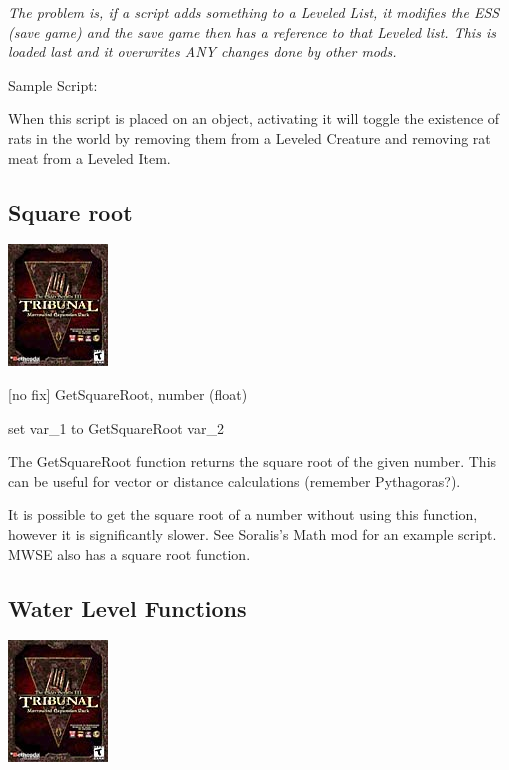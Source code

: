 \emph{\hfill\break
The problem is, if a script adds something to a Leveled List, it
modifies the ESS (save game) and the save game then has a reference to
that Leveled list. This is loaded last and it overwrites ANY changes
done by other mods.}

Sample Script:

When this script is placed on an object, activating it will toggle the
existence of rats in the world by removing them from a Leveled Creature
and removing rat meat from a Leveled Item.



\hypertarget{square-root}{%
\subsection{Square root}\label{square-root}}

\includegraphics{media/image6.png}

{[}no fix{]} GetSquareRoot, number (float)

set var\_1 to GetSquareRoot var\_2

The GetSquareRoot function returns the square root of the given number.
This can be useful for vector or distance calculations (remember
Pythagoras?).

It is possible to get the square root of a number without using this
function, however it is significantly slower. See Soralis's Math mod for
an example script. MWSE also has a square root function.

\hypertarget{water-level-functions}{%
\subsection{Water Level Functions}\label{water-level-functions}}

\includegraphics{media/image6.png}

